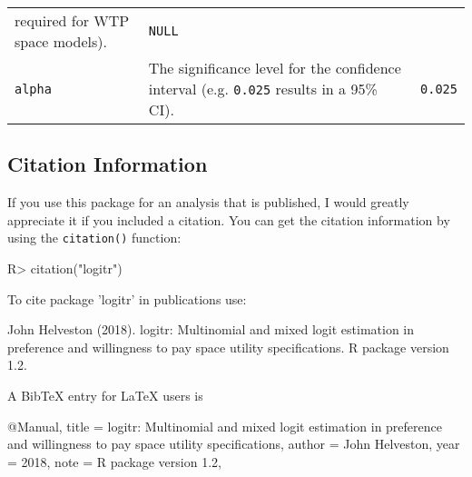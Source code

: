 \documentclass[article]{jss}
\begin{document}
\begin{longtable}[]{@{}lll@{}}
\begin{minipage}[t]{0.66\columnwidth}
required for WTP space models).\strut
\end{minipage} & \begin{minipage}[t]{0.11\columnwidth}\raggedright
\texttt{NULL}\strut
\end{minipage}\tabularnewline
\begin{minipage}[t]{0.14\columnwidth}\raggedright
\texttt{alpha}\strut
\end{minipage} & \begin{minipage}[t]{0.66\columnwidth}\raggedright
The significance level for the confidence interval (e.g. \texttt{0.025}
results in a 95\% CI).\strut
\end{minipage} & \begin{minipage}[t]{0.11\columnwidth}\raggedright
\texttt{0.025}\strut
\end{minipage}\tabularnewline
\bottomrule
\end{longtable}

\hypertarget{citation-information}{%
\subsection{Citation Information}\label{citation-information}}

If you use this package for an analysis that is published, I would
greatly appreciate it if you included a citation. You can get the
citation information by using the \texttt{citation()} function:

\begin{CodeChunk}

\begin{CodeInput}
R> citation("logitr")
\end{CodeInput}

\begin{CodeOutput}

To cite package 'logitr' in publications use:

  John Helveston (2018). logitr: Multinomial and mixed logit
  estimation in preference and willingness to pay space utility
  specifications. R package version 1.2.

A BibTeX entry for LaTeX users is

  @Manual{,
    title = {logitr: Multinomial and mixed logit estimation in preference and willingness to pay space utility specifications},
    author = {John Helveston},
    year = {2018},
    note = {R package version 1.2},
  }
\end{CodeOutput}
\end{CodeChunk}
\end{document}
